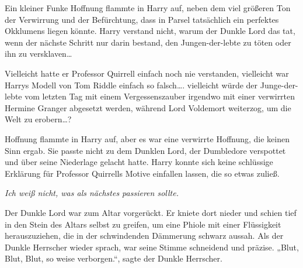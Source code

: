 Ein kleiner Funke Hoffnung flammte in Harry auf, neben dem viel größeren Ton der Verwirrung und der Befürchtung, dass in Parsel tatsächlich ein perfektes Okklumens liegen könnte. Harry verstand nicht, warum der Dunkle Lord das tat, wenn der nächste Schritt nur darin bestand, den Jungen-der-lebte zu töten oder ihn zu versklaven…

Vielleicht hatte er Professor Quirrell einfach noch nie verstanden, vielleicht war Harrys Modell von Tom Riddle einfach so falsch…. vielleicht würde der Junge-der-lebte vom letzten Tag mit einem Vergessenszauber irgendwo mit einer verwirrten Hermine Granger abgesetzt werden, während Lord Voldemort weiterzog, um die Welt zu erobern…?

Hoffnung flammte in Harry auf, aber es war eine verwirrte Hoffnung, die keinen Sinn ergab. Sie passte nicht zu dem Dunklen Lord, der Dumbledore verspottet und über seine Niederlage gelacht hatte. Harry konnte sich keine schlüssige Erklärung für Professor Quirrells Motive einfallen lassen, die so etwas zuließ.

\emph{Ich weiß nicht, was als nächstes passieren sollte.}

Der Dunkle Lord war zum Altar vorgerückt. Er kniete dort nieder und schien tief in den Stein des Altars selbst zu greifen, um eine Phiole mit einer Flüssigkeit herauszuziehen, die in der schwindenden Dämmerung schwarz aussah.
Als der Dunkle Herrscher wieder sprach, war seine Stimme schneidend und präzise.
„Blut, Blut, Blut, so weise verborgen.“, sagte der Dunkle Herrscher.

